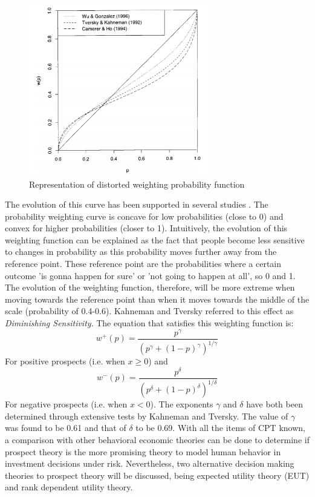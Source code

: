 \newline 
\begin{figure}[h!]
\centering
\includegraphics[width=8cm]{weighting-functions.png}
\caption[Representation of distorted weighting probability function]{Representation of distorted weighting probability function \cite{Weighting}}
\label{Figure:weight}
\end{figure}    
\newline
The evolution of this curve has been supported in several studies \cite{prospect2} \cite{Weighting2} \cite{Weighting3}. The probability weighting curve is concave for low probabilities (close to 0) and convex for higher probabilities (closer to 1). Intuitively, the evolution of this weighting function can be explained as the fact that people become less sensitive to changes in probability as this probability moves further away from the reference point. These reference point are the probabilities where a certain outcome 'is gonna happen for sure' or 'not going to happen at all', so 0 and 1. The evolution of the weighting function, therefore, will be more extreme when moving towards the reference point than when it moves towards the middle of the scale (probability of 0.4-0.6). Kahneman and Tversky referred to this effect as \textit{Diminishing Sensitivity}. The equation that satisfies this weighting function is:
\begin{equation}
    w^{+}(p) = \frac{p^{\gamma}}{(p^{\gamma} + (1-p)^{\gamma})^{1/\gamma}}
    \label{weight1}
\end{equation}
For positive prospects (i.e. when $x \geq 0$) and 
\begin{equation}
    w^{-}(p) = \frac{p^{\delta}}{(p^{\delta} + (1-p)^{\delta})^{1/\delta}}
    \label{weight2}
\end{equation}
\newline \newline \noindent
For negative prospects (i.e. when $x < 0$). The exponents $\gamma$ and $\delta$ have both been determined through extensive tests by Kahneman and Tversky. The value of $\gamma$ was found to be 0.61 and that of $\delta$ to be 0.69.
\newline \newline \noindent
With all the items of CPT known, a comparison with other behavioral economic theories can be done to determine if prospect theory is the more promising theory to model human behavior in investment decisions under risk. Nevertheless, two alternative decision making theories to prospect theory will be discussed, being expected utility theory (EUT) and rank dependent utility theory.
